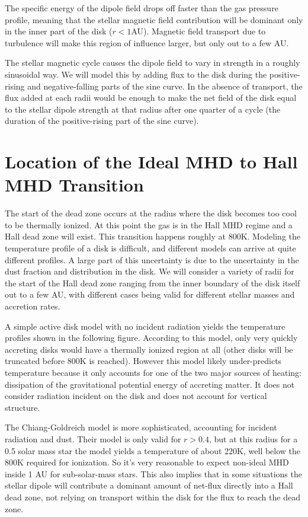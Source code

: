 The specific energy of the dipole field drops off faster than the gas pressure profile, meaning that the stellar magnetic field contribution will be dominant only in the inner part of the disk ($r<1$AU).  Magnetic field transport due to turbulence will make this region of influence larger, but only out to a few AU.

The stellar magnetic cycle causes the dipole field to vary in strength in a roughly sinusoidal way.  We will model this by adding flux to the disk during the positive-rising and negative-falling parts of the sine curve.  In the absence of transport, the flux added at each radii would be enough to make the net field of the disk equal to the stellar dipole strength at that radius after one quarter of a cycle (the duration of the positive-rising part of the sine curve).    





\section{Location of the Ideal MHD to Hall MHD Transition}
The start of the dead zone occurs at the radius where the disk becomes too cool to be thermally ionized.  At this point the gas is in the Hall MHD regime and a Hall dead zone will exist.  This transition happens roughly at 800K.  Modeling the temperature profile of a disk is difficult, and different models can arrive at quite different profiles.  A large part of this uncertainty is due to the uncertainty in the dust fraction and distribution in the disk.  We will consider a variety of radii for the start of the Hall dead zone ranging from the inner boundary of the disk itself out to a few AU, with different cases being valid for different stellar masses and accretion rates.        

A simple active disk model with no incident radiation yields the temperature profiles shown in the following figure.  According to this model, only very quickly accreting disks would have a thermally ionized region at all (other disks will be truncated before 800K is reached).  However this model likely under-predicts temperature because it only accounts for one of the two major sources of heating: dissipation of the gravitational potential energy of accreting matter.  It does not consider radiation incident on the disk and does not account for vertical structure. 

The Chiang-Goldreich model is more sophisticated, accounting for incident radiation and dust.  Their model is only valid for $r>0.4$, but at this radius for a 0.5 solar mass star the model yields a temperature of about 220K, well below the 800K required for ionization.  So it's very reasonable to expect non-ideal MHD inside 1 AU for sub-solar-mass stars.  This also implies that in some situations the stellar dipole will contribute a dominant amount of net-flux directly into a Hall dead zone, not relying on transport within the disk for the flux to reach the dead zone.

